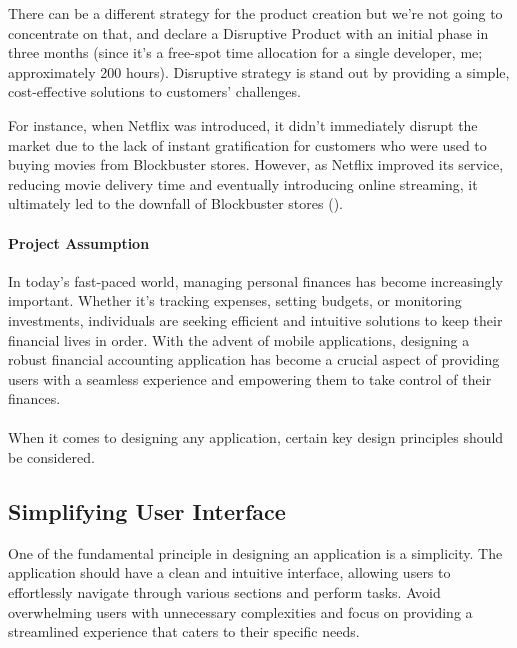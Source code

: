 
There can be a different strategy for the product creation but we're not going to concentrate on that,
and declare a Disruptive Product with an initial phase in three months (since it's a free-spot time allocation
for a single developer, me; approximately 200 hours). Disruptive strategy is stand out by providing a simple, 
cost-effective solutions to customers' challenges. 

For instance, when Netflix was introduced, it didn't immediately disrupt the market due to the lack of instant 
gratification for customers who were used to buying movies from Blockbuster stores. However, as Netflix 
improved its service, reducing movie delivery time and eventually introducing online streaming, it ultimately led 
to the downfall of Blockbuster stores (\cite{Eby17}).

\paragraph{Project Assumption}
In today's fast-paced world, managing personal finances has become increasingly important. Whether it's tracking 
expenses, setting budgets, or monitoring investments, individuals are seeking efficient and intuitive solutions to 
keep their financial lives in order. With the advent of mobile applications, designing a robust financial accounting 
application has become a crucial aspect of providing users with a seamless experience and empowering them to take 
control of their finances.\\
\\

\noindent When it comes to designing any application, certain key design principles should be considered. 

\subsection{Simplifying User Interface}

One of the fundamental principle in designing an application is a simplicity. The application should have a clean and 
intuitive interface, allowing users to effortlessly navigate through various sections and perform tasks. Avoid 
overwhelming users with unnecessary complexities and focus on providing a streamlined experience that caters to 
their specific needs.

